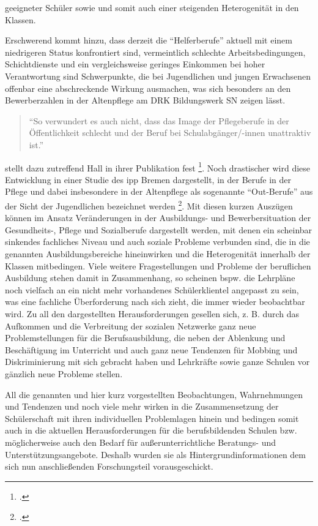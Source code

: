 geeigneter Schüler sowie und somit auch einer steigenden Heterogenität in den Klassen. 

Erschwerend kommt hinzu, dass derzeit die "`Helferberufe"' aktuell mit einem niedrigeren Status konfrontiert sind, vermeintlich schlechte Arbeitsbedingungen, Schichtdienste und ein vergleichsweise geringes Einkommen bei hoher Verantwortung sind Schwerpunkte, die bei Jugendlichen und jungen Erwachsenen offenbar eine abschreckende Wirkung ausmachen, was sich besonders an den Bewerberzahlen in der Altenpflege am DRK Bildungswerk SN zeigen lässt. 

\begin{quotation}
\noindent
"`So verwundert es auch nicht, dass das Image der Pflegeberufe in der Öffentlichkeit schlecht und der Beruf bei Schulabgänger/-innen unattraktiv ist."'
\end{quotation}

\noindent 
[\punkte] stellt dazu zutreffend Hall in ihrer Publikation fest \footcite[19]{Hall2012}. Noch drastischer wird diese Entwicklung in einer Studie des ipp Bremen dargestellt, in der Berufe in der Pflege und dabei insbesondere in der Altenpflege als sogenannte "`Out-Berufe"' aus der Sicht der Jugendlichen bezeichnet werden \footcite[18]{BPHP2010}. Mit diesen kurzen Auszügen können im Ansatz Veränderungen in der Ausbildungs- und Bewerbersituation der Gesundheits-, Pflege und Sozialberufe dargestellt werden, mit denen ein scheinbar sinkendes fachliches Niveau und auch soziale Probleme verbunden sind, die in die genannten Ausbildungsbereiche hineinwirken und die Heterogenität innerhalb der Klassen mitbedingen. Viele weitere Fragestellungen und Probleme der beruflichen Ausbildung stehen damit in Zusammenhang, so scheinen bspw. die Lehrpläne noch vielfach an ein nicht mehr vorhandenes Schülerklientel angepasst zu sein, was eine fachliche Überforderung nach sich zieht, die immer wieder beobachtbar wird. Zu all den dargestellten Herausforderungen gesellen sich, z. B. durch das Aufkommen und die Verbreitung der sozialen Netzwerke ganz neue Problemstellungen für die Berufsausbildung, die neben der Ablenkung und Beschäftigung im Unterricht und auch ganz neue Tendenzen für Mobbing und Diskriminierung mit sich gebracht haben und Lehrkräfte sowie ganze Schulen vor gänzlich neue Probleme stellen.

All die genannten und hier kurz vorgestellten Beobachtungen, Wahrnehmungen und Tendenzen und noch viele mehr wirken in die Zusammensetzung der Schülerschaft mit ihren individuellen Problemlagen hinein und bedingen somit auch in die aktuellen Herausforderungen für die berufsbildenden Schulen bzw. möglicherweise auch den Bedarf für außerunterrichtliche Beratungs- und Unterstützungsangebote. Deshalb wurden sie als Hintergrundinformationen dem sich nun anschließenden Forschungsteil vorausgeschickt. 
